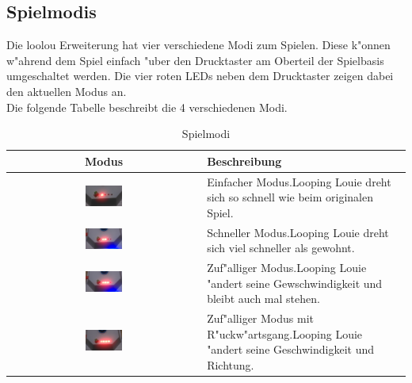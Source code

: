 \subsection{Spielmodis}

Die loolou Erweiterung hat vier verschiedene Modi zum Spielen. Diese k"onnen w"ahrend dem Spiel einfach "uber den Drucktaster am Oberteil der Spielbasis umgeschaltet werden.
Die vier roten LEDs neben dem Drucktaster zeigen dabei den aktuellen Modus an. \\
Die folgende Tabelle beschreibt die 4 verschiedenen Modi.

\vspace{1cm}
\begin{table}[ht]
	\centering

	\begin{tabular}{ c | p{8cm} } 
		Modus								& Beschreibung \\ 
		\hline \hline
		\includegraphics[width=0.2\textwidth]{pictures/mode_1.jpg}	& Einfacher Modus.\newline Looping Louie dreht sich so schnell wie beim originalen Spiel.  \\
		\hline
		\includegraphics[width=0.2\textwidth]{pictures/mode_2.jpg}	& Schneller Modus.\newline Looping Louie dreht sich viel schneller als gewohnt. \\
		\hline
		\includegraphics[width=0.2\textwidth]{pictures/mode_3.jpg}	& Zuf"alliger Modus.\newline Looping Louie "andert seine Gewschwindigkeit und bleibt auch mal stehen. \\
		\hline
		\includegraphics[width=0.2\textwidth]{pictures/mode_4.jpg}	& Zuf"alliger Modus mit R"uckw"artsgang.\newline Looping Louie "andert seine Geschwindigkeit und Richtung. \\
		\hline
	\end{tabular}

	\caption{Spielmodi}
	\label{table:mode}
\end{table}
\vspace{0.5cm}

